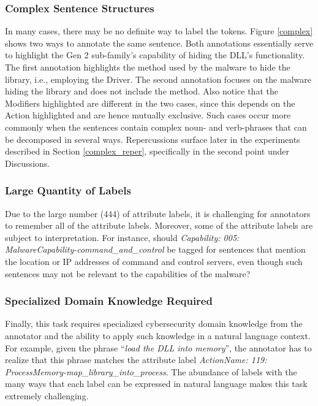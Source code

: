 \documentclass[11pt,a4paper]{article}
\begin{document}
\subsubsection{Complex Sentence Structures}

In many cases, there may be no definite way to label the tokens. Figure \ref{complex} shows two ways to annotate the same sentence. Both annotations essentially serve to highlight the Gen 2 sub-family's capability of hiding the DLL's functionality. The first annotation highlights the method used by the malware to hide the library, i.e., employing the Driver. The second annotation focuses on the malware hiding the library and does not include the method. Also notice that the Modifiers highlighted are different in the two cases, since this depends on the Action highlighted and are hence mutually exclusive. Such cases occur more commonly when the sentences contain complex noun- and verb-phrases that can be decomposed in several ways. Repercussions surface later in the experiments described in Section \ref{complex_reper}, specifically in the second point under Discussions.

\subsubsection{Large Quantity of Labels}
Due to the large number (444) of attribute labels, it is challenging for annotators to remember all of the attribute labels. Moreover, some of the attribute labels are subject to interpretation. For instance, should \emph{Capability: 005: MalwareCapability-command\_and\_control} be tagged for sentences that mention the location or IP addresses of command and control servers, even though such sentences may not be relevant to the capabilities of the malware?

\subsubsection{Specialized Domain Knowledge Required}
Finally, this task requires specialized cybersecurity domain knowledge from the annotator and the ability to apply such knowledge in a natural language context. For example, given the phrase ``\emph{load the DLL into memory}'', the annotator has to realize that this phrase matches the attribute label \emph{ActionName: 119: ProcessMemory-map\_library\_into\_process}. The abundance of labels with the many ways that each label can be expressed in natural language makes this task extremely challenging.
\end{document}
